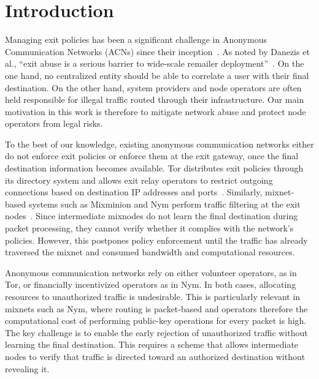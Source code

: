 \section{Introduction}

Managing exit policies has been a significant challenge in Anonymous Communication Networks (ACNs) since their inception~\cite{oram2001peer}. As noted by Danezis et al., ``exit abuse is a serious barrier to wide-scale remailer deployment''~\cite{danezis2003mixminion}. On the one hand, no centralized entity should be able to correlate a user with their final destination. On the other hand, system providers and node operators are often held responsible for illegal traffic routed through their infrastructure. Our main motivation in this work is therefore to mitigate network abuse and protect node operators from legal risks.

To the best of our knowledge, existing anonymous communication networks either do not enforce exit policies or enforce them at the exit gateway, once the final destination information becomes available. Tor distributes exit policies through its directory system and allows exit relay operators to restrict outgoing connections based on destination IP addresses and ports~\cite{onion-routing96}. Similarly, mixnet-based systems such as Mixminion and Nym perform traffic filtering at the exit nodes~\cite{danezis2003mixminion, nym}. Since intermediate mixnodes do not learn the final destination during packet processing, they cannot verify whether it complies with the network's policies. However, this postpones policy enforcement until the traffic has already traversed the mixnet and consumed bandwidth and computational resources.

Anonymous communication networks rely on either volunteer operators, as in Tor, or financially incentivized operators as in Nym. In both cases, allocating resources to unauthorized traffic is undesirable. This is particularly relevant in mixnets such as Nym, where routing is packet-based and operators therefore the computational cost of performing public-key operations for every packet is high. The key challenge is to enable the early rejection of unauthorized traffic without learning the final destination. This requires a scheme that allows intermediate nodes to verify that traffic is directed toward an authorized destination without revealing it.



